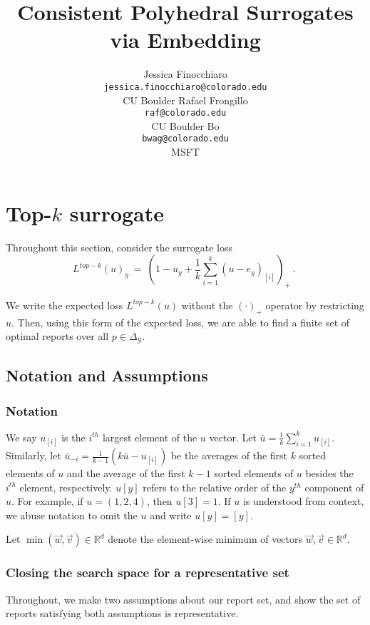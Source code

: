 \documentclass[12pt]{article}
\title{Consistent Polyhedral Surrogates via Embedding}
\author{%
 Jessica Finocchiaro\raf{Jessie?} \\
 \texttt{jessica.finocchiaro@colorado.edu}\\
 CU Boulder
 \And
 Rafael Frongillo\\
 \texttt{raf@colorado.edu}\\
 CU Boulder
 \And
 Bo\\
 \texttt{bwag@colorado.edu}\\
 MSFT
}
\newcommand{\reals}{\mathbb{R}}
\newcommand{\simplex}{\Delta_\Y}
\newcommand{\Y}{\mathcal{Y}}
\begin{document}
\section{Top-$k$ surrogate}

Throughout this section, consider the surrogate loss \begin{equation}\label{eq:top-k-surrogate}
L^{top-k}(u)_y~=~\left(1 - u_y + \frac{1}{k} \sum_{i=1}^k (u - e_y)_{[i]} \right)_+~.~
\end{equation}

We write the expected loss $L^{top-k}(u)$ without the $(\cdot)_+$ operator by restricting $u$.
Then, using this form of the expected loss, we are able to find a finite set of optimal reports over all $p \in \simplex$.

\subsection{Notation and Assumptions}
\subsubsection{Notation}
We say $u_{[i]}$ is the $i^{th}$ largest element of the $u$ vector.
Let $\bar{u} = \frac 1 k \sum_{i = 1}^k u_{[i]}$.
Similarly, let $\bar{u}_{-i} = \frac{1}{k-1} (k \bar u - u_{[i]})$ be the averages of the first $k$ sorted elements of $u$ and the average of the first $k-1$ sorted elements of $u$ besides the $i^{th}$ element, respectively.
$u[y]$ refers to the relative order of the $y^{th}$ component of $u$.
For example, if $u = (1,2,4)$, then $u[3] = 1$. 
If $u$ is understood from context, we abuse notation to omit the $u$ and write $u[y] = [y]$.

Let $\min(\vec w, \vec v) \in \reals^d$ denote the element-wise minimum of vectors $\vec w, \vec v \in \reals^d$.

\subsubsection{Closing the search space for a representative set}\label{sec:assumptions}
Throughout, we make two assumptions about our report set, and show the set of reports satisfying both assumptions is representative. 
\end{document}
